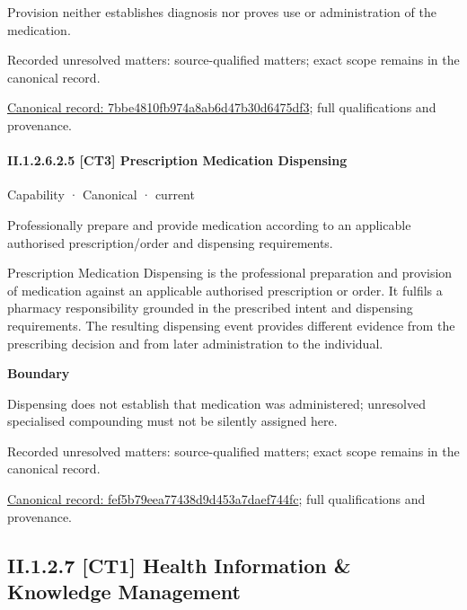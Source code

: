 Provision neither establishes diagnosis nor proves use or administration of the medication.


{\small Recorded unresolved matters: source-qualified matters; exact scope remains in the canonical record.}\par
{\footnotesize \href{../../../../../../../continuum/strategy/capability/7bbe4810fb974a8ab6d47b30d6475df3.md}{Canonical record: 7bbe4810fb974a8ab6d47b30d6475df3}; full qualifications and provenance.}\par
\paragraph*{II.1.2.6.2.5 [CT3] Prescription Medication Dispensing}
\label{navigation:II.1.2.6.2.5}

\label{element:fef5b79eea77438d9d453a7daef744fc}
{\small Capability · Canonical · current}\par

Professionally prepare and provide medication according to an applicable authorised prescription/order and dispensing requirements.



Prescription Medication Dispensing is the professional preparation and provision of medication against an applicable authorised prescription or order. It fulfils a pharmacy responsibility grounded in the prescribed intent and dispensing requirements. The resulting dispensing event provides different evidence from the prescribing decision and from later administration to the individual.



\textbf{Boundary}



Dispensing does not establish that medication was administered; unresolved specialised compounding must not be silently assigned here.


{\small Recorded unresolved matters: source-qualified matters; exact scope remains in the canonical record.}\par
{\footnotesize \href{../../../../../../../continuum/strategy/capability/fef5b79eea77438d9d453a7daef744fc.md}{Canonical record: fef5b79eea77438d9d453a7daef744fc}; full qualifications and provenance.}\par
\subsection*{II.1.2.7 [CT1] Health Information \& Knowledge Management}
\label{navigation:II.1.2.7}

